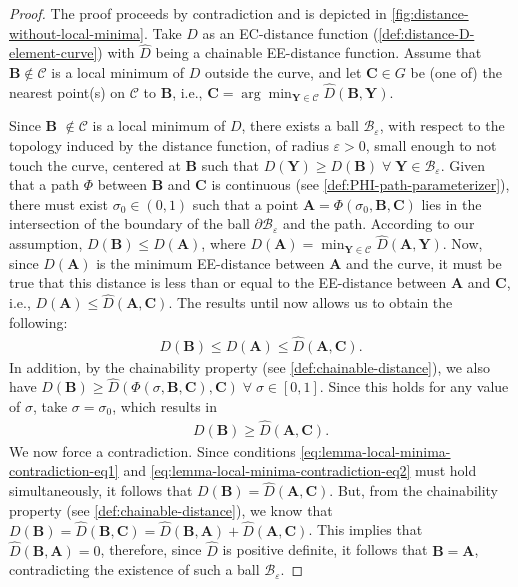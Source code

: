\begin{proof}
    The proof proceeds by contradiction and is depicted in \cref{fig:distance-without-local-minima}. Take $D$ as an EC-distance function (\cref{def:distance-D-element-curve}) with $\widehat{D}$ being a chainable EE-distance function. Assume that $\mathbf{B}\notin\mathcal{C}$ is a local minimum of $D$ outside the curve, and let $\mathbf{C} \in G$ be (one of) the nearest point(s) on $\mathcal{C}$ to $\mathbf{B}$, i.e., $\mathbf{C}=\arg\min_{\mathbf{Y}\in\mathcal{C}}\widehat{D}(\mathbf{B}, \mathbf{Y})$.

     Since $\mathbf{B}$ $\not \in \mathcal{C}$ is a local minimum of $D$, there exists a ball $\mathcal{B}_\varepsilon$, with respect to the topology induced by the distance function, of radius $\varepsilon>0$, small enough to not touch the curve, centered at $\mathbf{B}$ such that $D(\mathbf{Y}) \ge D(\mathbf{B})\; \forall\; \mathbf{Y} \in \mathcal{B}_\varepsilon$. Given that a path $\Phi$ between $\mathbf{B}$ and $\mathbf{C}$ is continuous (see \cref{def:PHI-path-parameterizer}), there must exist $\sigma_0 \in (0,1)$ such that a point $\mathbf{A}=\Phi(\sigma_0, \mathbf{B}, \mathbf{C})$ lies in the intersection of the boundary of the ball $\partial\mathcal{B}_\varepsilon$ and the path. According to our assumption, $D(\mathbf{B}) \le D(\mathbf{A})$, where $D(\mathbf{A}) = \min_{\mathbf{Y}\in\mathcal{C}} \widehat{D}(\mathbf{A}, \mathbf{Y})$. Now, since $D(\mathbf{A})$ is the minimum EE-distance between $\mathbf{A}$ and the curve, it must be true that this distance is less than or equal to the EE-distance between $\mathbf{A}$ and $\mathbf{C}$, i.e., $D(\mathbf{A})\le \widehat{D}(\mathbf{A}, \mathbf{C})$. The results until now allows us to obtain the following:
     \begin{align}
         D(\mathbf{B}) \le D(\mathbf{A}) \le \widehat{D}(\mathbf{A}, \mathbf{C}). \label{eq:lemma-local-minima-contradiction-eq1}
     \end{align}
    In addition, by the chainability property (see \cref{def:chainable-distance}), we also have $D(\mathbf{B}) \ge \widehat{D}(\Phi(\sigma, \mathbf{B}, \mathbf{C}), \mathbf{C})\;\forall\;\sigma\in[0,1]$. Since this holds for any value of $\sigma$, take $\sigma=\sigma_0$, which results in 
    \begin{align}
        D(\mathbf{B}) \ge \widehat{D}(\mathbf{A}, \mathbf{C}). \label{eq:lemma-local-minima-contradiction-eq2}
    \end{align}
    We now force a contradiction. Since conditions \eqref{eq:lemma-local-minima-contradiction-eq1} and \eqref{eq:lemma-local-minima-contradiction-eq2} must hold simultaneously, it follows that $D(\mathbf{B}) = \widehat{D}(\mathbf{A}, \mathbf{C})$. But, from the chainability property (see \cref{def:chainable-distance}), we know that $D(\mathbf{B}) = \widehat{D}(\mathbf{B}, \mathbf{C}) = \widehat{D}(\mathbf{B}, \mathbf{A}) + \widehat{D}(\mathbf{A}, \mathbf{C})$. This implies that $\widehat{D}(\mathbf{B}, \mathbf{A})=0$, therefore, since $\widehat{D}$ is positive definite, it follows that $\mathbf{B}=\mathbf{A}$, contradicting the existence of such a ball $\mathcal{B}_\varepsilon$. 
\end{proof}

